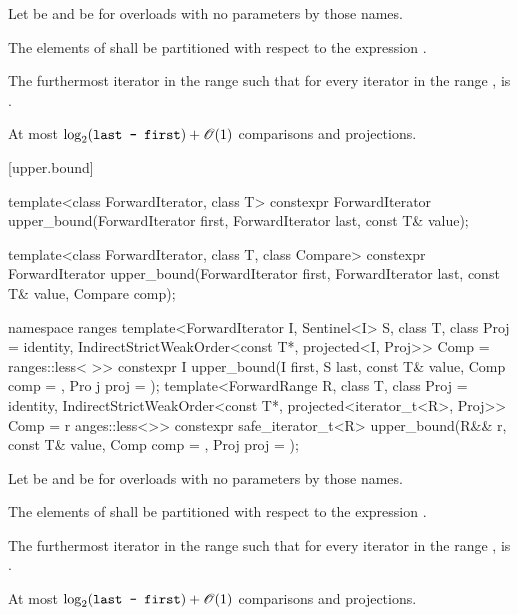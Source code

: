 \begin{itemdescr}
\pnum
Let  be  and
 be 
for overloads with no parameters by those names.

\pnum
\requires
The elements
of
shall be partitioned with respect to the expression
.

\pnum
\returns
The furthermost iterator
in the range
such that for every iterator
in the range
,
 is .

\pnum
\complexity
At most
$\log_2(\texttt{last - first}) + \mathscr{O}(1)$
comparisons and projections.
\end{itemdescr}

[upper.bound]{}

%
\begin{itemdecl}
template<class ForwardIterator, class T>
  constexpr ForwardIterator
    upper_bound(ForwardIterator first, ForwardIterator last,
                const T& value);

template<class ForwardIterator, class T, class Compare>
  constexpr ForwardIterator
    upper_bound(ForwardIterator first, ForwardIterator last,
                const T& value, Compare comp);

namespace ranges {
  template<ForwardIterator I, Sentinel<I> S, class T, class Proj = identity,
      IndirectStrictWeakOrder<const T*, projected<I, Proj>> Comp = ranges::less<
>>
    constexpr I upper_bound(I first, S last, const T& value, Comp comp = {}, Pro
j proj = {});
  template<ForwardRange R, class T, class Proj = identity,
      IndirectStrictWeakOrder<const T*, projected<iterator_t<R>, Proj>> Comp = r
anges::less<>>
    constexpr safe_iterator_t<R>
      upper_bound(R&& r, const T& value, Comp comp = {}, Proj proj = {});
}
\end{itemdecl}

\begin{itemdescr}
\pnum
Let  be  and
 be 
for overloads with no parameters by those names.

\pnum
\requires
The elements
of
shall be partitioned with respect to the expression
.

\pnum
\returns
The furthermost iterator
in the range
such that for every iterator
in the range
,
 is .

\pnum
\complexity
At most
$\log_2(\texttt{last - first}) + \mathscr{O}(1)$
comparisons and projections.
\end{itemdescr}

